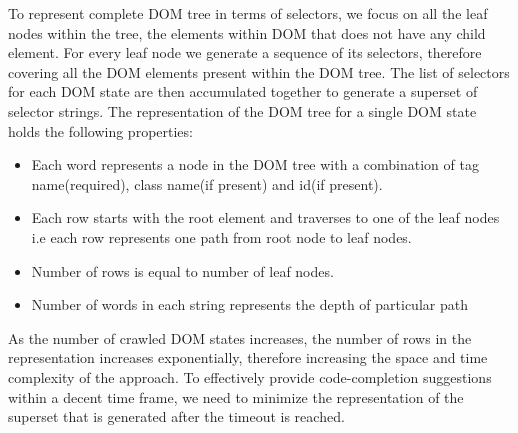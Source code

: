 		To represent complete DOM tree in terms of \css selectors, we focus on all the leaf nodes within the tree, \ie the elements within DOM that does not have any child element. For every leaf node we generate a sequence of its \css selectors, therefore covering all the DOM elements present within the DOM tree. The list of \css selectors for each DOM state are then accumulated together to generate a superset of \css selector strings. The \css representation of the DOM tree for a single DOM state holds the following properties:
		\begin{itemize}
			 \item Each word represents a node in the DOM tree with a combination of tag name(required), class name(if present) and id(if present).
			 \item Each row starts with the root element and traverses to one of the leaf nodes i.e each row represents one path from root node to leaf nodes.
			\item Number of rows is equal to number of leaf nodes.
			 \item Number of words in each string represents the depth of particular path
		\end{itemize}
		
		As the number of crawled DOM states increases, the number of rows in the \css representation increases exponentially, therefore increasing the space and time complexity of the approach. To effectively provide code-completion suggestions within a decent time frame, we need to minimize the \css representation of the superset that is generated after the timeout is reached.
		
